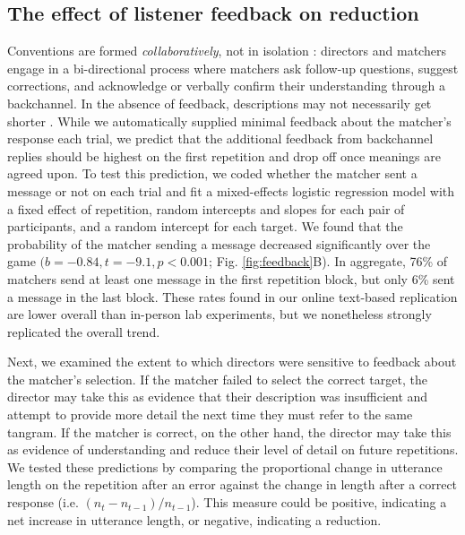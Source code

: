 \documentclass[alpha-refs]{wiley-article}
\begin{document}
\subsection{The effect of listener feedback on reduction}\label{listener-feedback}

Conventions are formed \emph{collaboratively}, not in isolation \citep{ClarkWilkesGibbs86_ReferringCollaborative}: 
directors and matchers engage in a bi-directional process where matchers ask follow-up questions, suggest corrections, and acknowledge or verbally confirm their understanding through a backchannel. 
In the absence of feedback, descriptions may not necessarily get shorter \citep{KraussWeinheimer66_Tangrams, GarrodFayLeeOberlanderMacLeod07_GraphicalSymbolSystems}.
While we automatically supplied minimal feedback about the matcher's response each trial, we predict that the additional feedback from backchannel replies should be highest on the first repetition and drop off once meanings are agreed upon. 
To test this prediction, we coded whether the matcher sent a message or not on each trial and fit a mixed-effects logistic regression model with a fixed effect of repetition, random intercepts and slopes for each pair of participants, and a random intercept for each target. 
We found that the probability of the matcher sending a message decreased significantly over the game $(b=-0.84, t = -9.1, p < 0.001$; Fig. \ref{fig:feedback}B).
In aggregate, 76\% of matchers send at least one message in the first repetition block, but only 6\% sent a message in the last block.
These rates found in our online text-based replication are lower overall than in-person lab experiments, but we nonetheless strongly replicated the overall trend.

Next, we examined the extent to which directors were sensitive to feedback about the matcher's selection.
If the matcher failed to select the correct target, the director may take this as evidence that their description was insufficient and attempt to provide more detail the next time they must refer to the same tangram. 
If the matcher is correct, on the other hand, the director may take this as evidence of understanding and reduce their level of detail on future repetitions.
We tested these predictions by comparing the proportional change in utterance length on the repetition after an error against the change in length after a correct response (i.e. $(n_t - n_{t-1})/n_{t-1}$).
This measure could be positive, indicating a net increase in utterance length, or negative, indicating a reduction.
\end{document}
